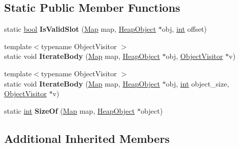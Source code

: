 \subsection*{Static Public Member Functions}
\begin{DoxyCompactItemize}
\item 
\mbox{\label{classv8_1_1internal_1_1SubclassBodyDescriptor_a2f9ce574f4c36bb369281afc750efa4e}} 
static \mbox{\hyperlink{classbool}{bool}} {\bfseries Is\+Valid\+Slot} (\mbox{\hyperlink{classv8_1_1internal_1_1Map}{Map}} map, \mbox{\hyperlink{classv8_1_1internal_1_1HeapObject}{Heap\+Object}} $\ast$obj, \mbox{\hyperlink{classint}{int}} offset)
\item 
\mbox{\label{classv8_1_1internal_1_1SubclassBodyDescriptor_a65acdfdc3a42b613b1e3e45be33d153a}} 
{\footnotesize template$<$typename Object\+Visitor $>$ }\\static void {\bfseries Iterate\+Body} (\mbox{\hyperlink{classv8_1_1internal_1_1Map}{Map}} map, \mbox{\hyperlink{classv8_1_1internal_1_1HeapObject}{Heap\+Object}} $\ast$obj, \mbox{\hyperlink{classv8_1_1internal_1_1ObjectVisitor}{Object\+Visitor}} $\ast$v)
\item 
\mbox{\label{classv8_1_1internal_1_1SubclassBodyDescriptor_abe8562c6c0171cb1c44e8ce4e83756ac}} 
{\footnotesize template$<$typename Object\+Visitor $>$ }\\static void {\bfseries Iterate\+Body} (\mbox{\hyperlink{classv8_1_1internal_1_1Map}{Map}} map, \mbox{\hyperlink{classv8_1_1internal_1_1HeapObject}{Heap\+Object}} $\ast$obj, \mbox{\hyperlink{classint}{int}} object\+\_\+size, \mbox{\hyperlink{classv8_1_1internal_1_1ObjectVisitor}{Object\+Visitor}} $\ast$v)
\item 
\mbox{\label{classv8_1_1internal_1_1SubclassBodyDescriptor_a99fb1ef1a303b74e84f5a455e9cd507b}} 
static \mbox{\hyperlink{classint}{int}} {\bfseries Size\+Of} (\mbox{\hyperlink{classv8_1_1internal_1_1Map}{Map}} map, \mbox{\hyperlink{classv8_1_1internal_1_1HeapObject}{Heap\+Object}} $\ast$object)
\end{DoxyCompactItemize}
\subsection*{Additional Inherited Members}


